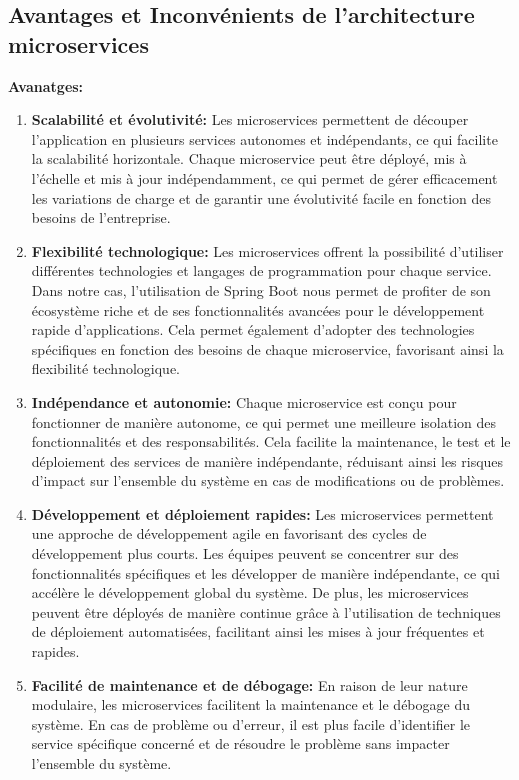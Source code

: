 \subsection{Avantages et Inconvénients de l'architecture microservices}
\textbf{Avanatges:}
\begin{enumerate}
    \item \textbf{Scalabilité et évolutivité:} Les microservices permettent de découper l'application en plusieurs services autonomes et indépendants, ce qui facilite la scalabilité horizontale. Chaque microservice peut être déployé, mis à l'échelle et mis à jour indépendamment, ce qui permet de gérer efficacement les variations de charge et de garantir une évolutivité facile en fonction des besoins de l'entreprise.
    \item \textbf{Flexibilité technologique:} Les microservices offrent la possibilité d'utiliser différentes technologies et langages de programmation pour chaque service. Dans notre cas, l'utilisation de Spring Boot nous permet de profiter de son écosystème riche et de ses fonctionnalités avancées pour le développement rapide d'applications. Cela permet également d'adopter des technologies spécifiques en fonction des besoins de chaque microservice, favorisant ainsi la flexibilité technologique.
    \item \textbf{Indépendance et autonomie:} Chaque microservice est conçu pour fonctionner de manière autonome, ce qui permet une meilleure isolation des fonctionnalités et des responsabilités. Cela facilite la maintenance, le test et le déploiement des services de manière indépendante, réduisant ainsi les risques d'impact sur l'ensemble du système en cas de modifications ou de problèmes.
    \item \textbf{Développement et déploiement rapides:} Les microservices permettent une approche de développement agile en favorisant des cycles de développement plus courts. Les équipes peuvent se concentrer sur des fonctionnalités spécifiques et les développer de manière indépendante, ce qui accélère le développement global du système. De plus, les microservices peuvent être déployés de manière continue grâce à l'utilisation de techniques de déploiement automatisées, facilitant ainsi les mises à jour fréquentes et rapides.
    \item \textbf{Facilité de maintenance et de débogage:} En raison de leur nature modulaire, les microservices facilitent la maintenance et le débogage du système. En cas de problème ou d'erreur, il est plus facile d'identifier le service spécifique concerné et de résoudre le problème sans impacter l'ensemble du système.
\end{enumerate}


